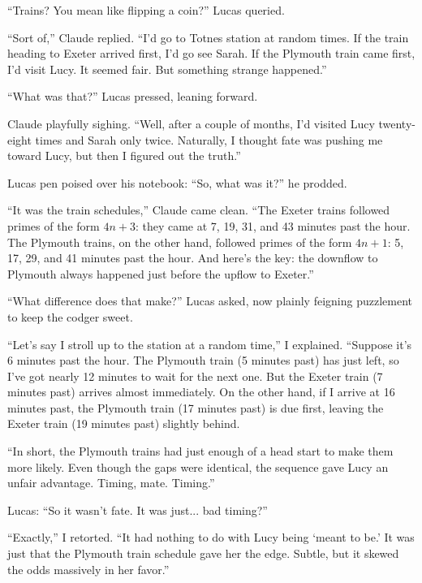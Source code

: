 “Trains? You mean like flipping a coin?” Lucas queried.

\smallskip

“Sort of,” Claude replied. “I’d go to Totnes station at random times. If the train heading to Exeter arrived first, I’d go see Sarah. If the Plymouth train came first, I’d visit Lucy. It seemed fair. But something strange happened.”  

“What was that?” Lucas pressed, leaning forward.

\smallskip

Claude playfully sighing. “Well, after a couple of months, I’d visited Lucy twenty-eight times and Sarah only twice. Naturally, I thought fate was pushing me toward Lucy, but then I figured out the truth.”  

Lucas pen poised over his notebook: “So, what was it?” he prodded.

“It was the train schedules,” Claude came clean. “The Exeter trains followed primes of the form \(4n+3\): they came at 7, 19, 31, and 43 minutes past the hour. The Plymouth trains, on the other hand, followed primes of the form \(4n+1\): 5, 17, 29, and 41 minutes past the hour. And here’s the key: the downflow to Plymouth always happened just before the upflow to Exeter.”  

\smallskip

“What difference does that make?” Lucas asked, now plainly feigning puzzlement to keep the codger sweet.

\smallskip

“Let’s say I stroll up to the station at a random time,” I explained. “Suppose it’s 6 minutes past the hour. The Plymouth train (5 minutes past) has just left, so I’ve got nearly 12 minutes to wait for the next one. But the Exeter train (7 minutes past) arrives almost immediately. On the other hand, if I arrive at 16 minutes past, the Plymouth train (17 minutes past) is due first, leaving the Exeter train (19 minutes past) slightly behind.

\smallskip

“In short, the Plymouth trains had just enough of a head start to make them more likely. Even though the gaps were identical, the sequence gave Lucy an unfair advantage. Timing, mate. Timing.”  

\smallskip

Lucas: “So it wasn’t fate. It was just... bad timing?” 

\smallskip

“Exactly,” I retorted. “It had nothing to do with Lucy being ‘meant to be.’ It was just that the Plymouth train schedule gave her the edge. Subtle, but it skewed the odds massively in her favor.”  

